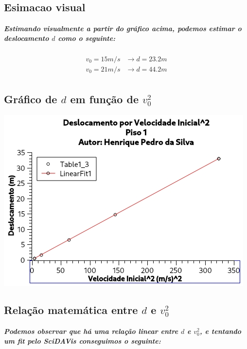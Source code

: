 \documentclass[12pt,twoside, a4paper, twocolumn]{article}
\begin{document}
\subsection{Esimacao visual}

\subparagraph*{Estimando visualmente a partir do gráfico acima, podemos estimar o deslocamento $d$ como o seguinte:}

\begin{equation}
    \begin{aligned}
        v_0 = 15 m/s & \rightarrow d = 23.2 m \\
        v_0 = 21 m/s & \rightarrow d = 44.2 m \\
    \end{aligned}
\end{equation}

\subsection{Gráfico de $d$ em função de $v_0^2$}



\begin{adjustbox}{scale=0.75}
    \includegraphics{Grafico-1.jpg}
\end{adjustbox}

\subsection{Relação matemática entre $d$ e $v_0^2$}

\subparagraph*{Podemos observar que há uma relação linear entre $d$ e $v_0^2$, e tentando um \emph{fit} pelo SciDAVis conseguimos o seguinte: }
\end{document}
